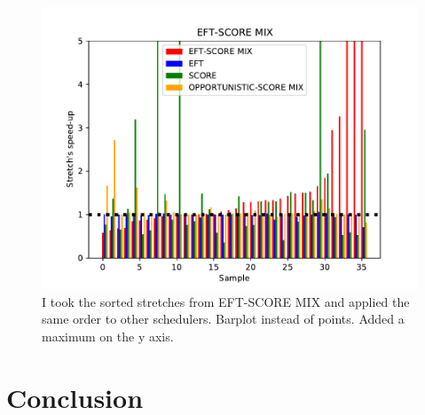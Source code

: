 \documentclass[conference,10pt]{IEEEtran}
\begin{document}
\begin{figure}\centering\includegraphics[width=1\linewidth]{../MBSS/plot/Scatter/scatter_mean_stretch_all_workloads_EFT-SCORE-MIX_v2.pdf}\caption{I took the sorted stretches from EFT-SCORE MIX and applied the same order to other schedulers. Barplot instead of points. Added a maximum on the y axis.}\end{figure}

\section{Conclusion}\label{sec.conclusion}




\end{document}
